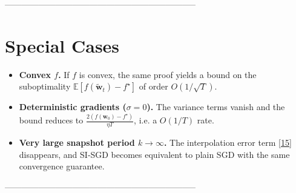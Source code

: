 \documentclass{article}
\begin{document}
--------------------------------------------------------------------

\section*{Special Cases}
\begin{itemize}
\item \textbf{Convex $f$.} If $f$ is convex, the same proof yields a bound on the suboptimality $ \mathbb{E}[f(\tilde{\mathbf{w}}_t)-f^\star]$ of order $O(1/\sqrt{T})$.
\item \textbf{Deterministic gradients ($\sigma=0$).} The variance terms vanish and the bound reduces to $\frac{2(f(\mathbf{w}_0)-f^\star)}{\eta T}$, i.e. a $O(1/T)$ rate.
\item \textbf{Very large snapshot period $k\to\infty$.} The interpolation error term \eqref{15} disappears, and SI‑SGD becomes equivalent to plain SGD with the same convergence guarantee.
\end{itemize}

--------------------------------------------------------------------
\end{document}
